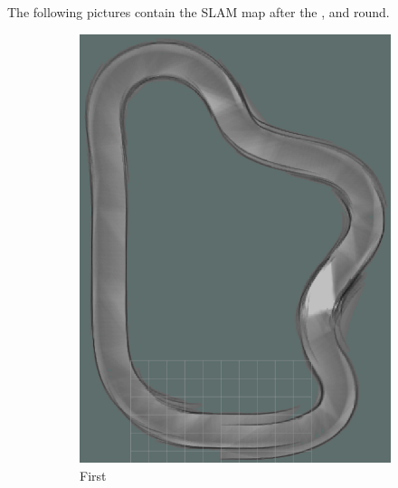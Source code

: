 The following pictures contain the SLAM map after the , and  round.\\

\begin{figure}[H]
	\centering
	\begin{subfigure}{.3\linewidth}
		\includegraphics[width=\textwidth]{Pictures/1slamtest1}
		\caption{First}
		\end{subfigure}	
	\begin{subfigure}{.3\linewidth}

\end{subfigure}
\end{figure}

